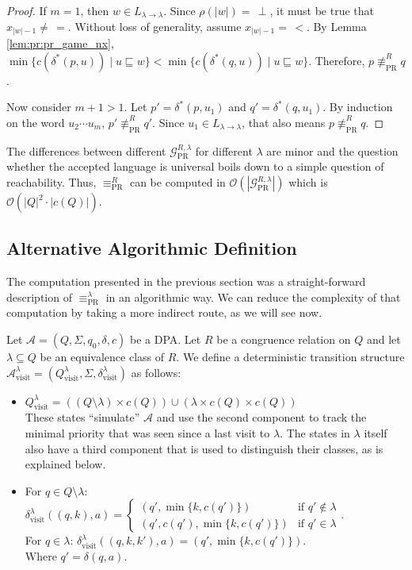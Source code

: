 \begin{proof}
	If $m = 1$, then $w \in L_{\lambda \rightarrow \lambda}$. Since $\rho(|w|) =\, \perp$, it must be true that $x_{|w|-1} \neq\, =$. Without loss of generality, assume $x_{|w|-1} =\, <$. By Lemma \ref{lem:pr:pr_game_nx}, $\min \{ c(\delta^*(p, u)) \mid u \sqsubseteq w \} < \min \{ c(\delta^*(q, u)) \mid u \sqsubseteq w \}$. Therefore, $p \not\equiv_\text{PR}^R q$.
	
	Now consider $m+1 > 1$. Let $p' = \delta^*(p, u_1)$ and $q' = \delta^*(q, u_1)$. By induction on the word $u_2 \cdots u_m$, $p' \not\equiv_\text{PR}^R q'$. Since $u_1 \in L_{\lambda \rightarrow \lambda}$, that also means $p \not\equiv_\text{PR}^R q$.
\end{proof}

The differences between different $\mathcal{G}_\text{PR}^{R,\lambda}$ for different $\lambda$ are minor and the question whether the accepted language is universal boils down to a simple question of reachability. Thus, $\equiv_\text{PR}^R$ can be computed in $\mathcal{O}(|\mathcal{G}_\text{PR}^{R,\lambda}|)$ which is $\mathcal{O}(|Q|^2 \cdot |c(Q)|)$.



\subsection{Alternative Algorithmic Definition}
The computation presented in the previous section was a straight-forward description of $\equiv_\text{PR}^\lambda$ in an algorithmic way. We can reduce the complexity of that computation by taking a more indirect route, as we will see now.

\begin{defn}
	Let $\mathcal{A} = (Q, \Sigma, q_0, \delta, c)$ be a DPA. Let $R$ be a congruence relation on $Q$ and let $\lambda \subseteq Q$ be an equivalence class of $R$. We define a deterministic transition structure $\mathcal{A}^\lambda_\text{visit} = (Q^\lambda_\text{visit}, \Sigma, \delta^\lambda_\text{visit})$ as follows:
	
	\begin{itemize}
		\item $Q^\lambda_\text{visit} = ((Q \setminus \lambda) \times c(Q)) \cup (\lambda \times c(Q) \times c(Q))$ \\
		These states \enquote{simulate} $\mathcal{A}$ and use the second component to track the minimal priority that was seen since a last visit to $\lambda$. The states in $\lambda$ itself also have a third component that is used to distinguish their classes, as is explained below.
		\item For $q \in Q \setminus \lambda$: $\delta^\lambda_\text{visit}((q, k), a) = \begin{cases}
			(q', \min \{k, c(q')\}) & \text{if } q' \notin \lambda \\
			(q', c(q'), \min \{k, c(q')\}) & \text{if } q' \in \lambda
		\end{cases}$. \\
		For $q \in \lambda$: $\delta^\lambda_\text{visit}((q, k, k'), a) = (q', \min \{k, c(q')\})$. \\
		Where $q' = \delta(q, a)$.
	\end{itemize}
\end{defn}

